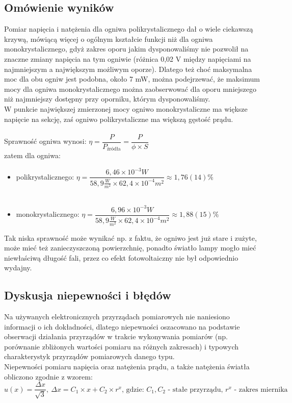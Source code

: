 \documentclass[12pt,a4paper]{article}
\begin{document}
\subsection{Omówienie wyników}
Pomiar napięcia i natężenia dla ogniwa polikrystalicznego dał o wiele ciekawszą krzywą, mówiącą więcej o ogólnym kształcie funkcji niż dla ogniwa monokrystalicznego, gdyż zakres oporu jakim dysponowaliśmy nie pozwolił na znaczne zmiany napięcia na tym ogniwie (różnica 0,02 V między napięciami na najmniejszym a największym możliwym oporze). Dlatego też choć maksymalna moc dla obu ogniw jest podobna, około 7 mW, można podejrzewać, że maksimum mocy dla ogniwa monokrystalicznego można zaobserwować dla oporu mniejszego niż najmniejszy dostępny przy oporniku, którym dysponowaliśmy. \\
W punkcie największej zmierzonej mocy ogniwo monokrystaliczne ma większe napięcie na sekcję, zaś ogniwo polikrystaliczne ma większą gęstość prądu.\\\\
Sprawność ogniwa wynosi:
$\eta = \dfrac{P}{P_{\text{źródła}}} = \dfrac{P}{\phi \times S}$ \\
zatem dla ogniwa:\\
\begin{itemize}
\item polikrystalicznego:
$\eta = \dfrac{6,46 \times 10^{-3} W}{58,9 \frac{W}{m^2} \times 62,4 \times 10^{-4} m^2} \approx 1,76(14) \%$ \\\\
\item monokrystalicznego:
$\eta = \dfrac{6,96 \times 10^{-3} W}{58,9 \frac{W}{m^2} \times 62,4 \times 10^{-4} m^2} \approx 1,88(15) \% $
\end{itemize}
Tak niska sprawność może wynikać np. z faktu, że ogniwo jest już stare i zużyte, może mieć też zanieczyszczoną powierzchnię, ponadto światło lampy mogło mieć niewłaściwą długość fali, przez co efekt fotowoltaiczny nie był odpowiednio wydajny.

\subsection{Dyskusja niepewności i błędów}
Na używanych elektronicznych przyrządach pomiarowych nie naniesiono informacji o ich dokładności, dlatego niepewności oszacowano na podstawie obserwacji działania przyrządów w trakcie wykonywania pomiarów (np. porównanie zbliżonych wartości pomiaru na różnych zakresach) i typowych charakterystyk przyrządów pomiarowych danego typu.\\
Niepewności pomiaru napięcia oraz natężenia prądu, a także natężenia światła obliczono zgodnie z wzorem:
$$u(x) = \frac{\Delta x}{\sqrt{3}},\ \Delta x = C_1 \times x + C_2 \times r^x
\text{, gdzie: $C_1, C_2$ - stałe przyrządu, $r^x$ - zakres miernika}$$
\end{document}
